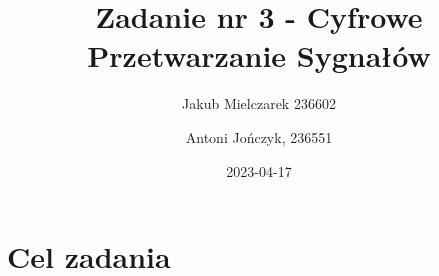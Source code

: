 \documentclass[12pt]{article}
\title{{\bf Zadanie nr 3 -}\linebreak
	Cyfrowe Przetwarzanie Sygnałów}
\author{Jakub Mielczarek 236602 \and Antoni Jończyk, 236551}
\date{2023-04-17} %
\begin{document}
\clearpage\maketitle
\thispagestyle{empty}
\newpage
\setcounter{page}{1}
\section{Cel zadania}
\cite{instrukcja2}



\cite{instrukcja}
\renewcommand\refname{Bibliografia}


\end{document}
